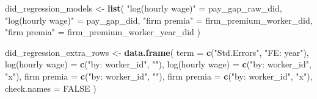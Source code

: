 \documentclass[
]{article}
\newenvironment{Shaded}{\begin{snugshade}}{\end{snugshade}}
\newcommand{\AttributeTok}[1]{\textcolor[rgb]{0.13,0.29,0.53}{#1}}
\newcommand{\ConstantTok}[1]{\textcolor[rgb]{0.56,0.35,0.01}{#1}}
\newcommand{\FunctionTok}[1]{\textcolor[rgb]{0.13,0.29,0.53}{\textbf{#1}}}
\newcommand{\NormalTok}[1]{#1}
\newcommand{\OtherTok}[1]{\textcolor[rgb]{0.56,0.35,0.01}{#1}}
\newcommand{\StringTok}[1]{\textcolor[rgb]{0.31,0.60,0.02}{#1}}
\begin{document}
\begin{Shaded}
\begin{Highlighting}[]
\NormalTok{did\_regression\_models }\OtherTok{\textless{}{-}} \FunctionTok{list}\NormalTok{(}
    \StringTok{"log(hourly wage)"} \OtherTok{=}\NormalTok{ pay\_gap\_raw\_did,}
    \StringTok{"log(hourly wage)"} \OtherTok{=}\NormalTok{ pay\_gap\_did,}
    \StringTok{"firm premia"} \OtherTok{=}\NormalTok{ firm\_premium\_worker\_did,}
    \StringTok{"firm premia"} \OtherTok{=}\NormalTok{ firm\_premium\_worker\_year\_did}
\NormalTok{)}

\NormalTok{did\_regression\_extra\_rows }\OtherTok{\textless{}{-}} \FunctionTok{data.frame}\NormalTok{(}
    \AttributeTok{term =} \FunctionTok{c}\NormalTok{(}\StringTok{"Std.Errors"}\NormalTok{, }\StringTok{"FE: year"}\NormalTok{),}
    \StringTok{\textasciigrave{}}\AttributeTok{log(hourly wage)}\StringTok{\textasciigrave{}} \OtherTok{=} \FunctionTok{c}\NormalTok{(}\StringTok{"by: worker\_id"}\NormalTok{, }\StringTok{""}\NormalTok{),}
    \StringTok{\textasciigrave{}}\AttributeTok{log(hourly wage)}\StringTok{\textasciigrave{}} \OtherTok{=} \FunctionTok{c}\NormalTok{(}\StringTok{"by: worker\_id"}\NormalTok{, }\StringTok{"x"}\NormalTok{),}
    \StringTok{\textasciigrave{}}\AttributeTok{firm premia}\StringTok{\textasciigrave{}} \OtherTok{=} \FunctionTok{c}\NormalTok{(}\StringTok{"by: worker\_id"}\NormalTok{, }\StringTok{""}\NormalTok{),}
    \StringTok{\textasciigrave{}}\AttributeTok{firm premia}\StringTok{\textasciigrave{}} \OtherTok{=} \FunctionTok{c}\NormalTok{(}\StringTok{"by: worker\_id"}\NormalTok{, }\StringTok{"x"}\NormalTok{),}
    \AttributeTok{check.names =} \ConstantTok{FALSE}
\NormalTok{)}


\end{Highlighting}
\end{Shaded}
\end{document}
